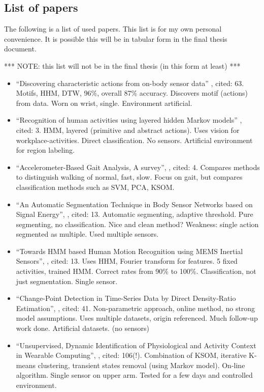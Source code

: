 
\subsection{List of papers}
The following is a list of used papers.
This list is for my own personal convenience.
It is possible this will be in tabular form in the final thesis document.

*** NOTE: this list will not be in the final thesis (in this form at least) ***

\begin{itemize}
  \item ``Discovering characteristic actions from on-body sensor data'' \cite{minnen2006discovering}, cited: 63. Motifs, HHM, DTW, 96\%, overall 87\% accuracy. Discovers motif (actions) from data. Worn on wrist, single. Environment artificial.
  \item ``Recognition of human activities using layered hidden Markov models'' \cite{perdikis2008recognition}, cited: 3. HMM, layered (primitive and abstract actions). Uses vision for workplace-activities. Direct classification. No sensors. Artificial environment for region labeling.
  \item ``Accelerometer-Based Gait Analysis, A survey'', \cite{derawi2010accelerometer}, cited: 4. Compares methods to distinguish walking of normal, fast, slow. Focus on gait, but compares classification methods such as SVM, PCA, KSOM.
  \item ``An Automatic Segmentation Technique in Body Sensor Networks based on Signal Energy'', \cite{guenterberg2009automatic}, cited: 13. Automatic segmenting, adaptive threshold. Pure segmenting, no classification. Nice and clean method? Weakness: single action segmented as multiple. Used multiple sensors.
  \item ``Towards HMM based Human Motion Recognition using MEMS Inertial Sensors'', \cite{shi2009towards}, cited: 13. Uses HHM, Fourier transform for features. 5 fixed activities, trained HMM. Correct rates from 90\% to 100\%. Classification, not just segmentation. Single sensor.
  \item ``Change-Point Detection in Time-Series Data by Direct Density-Ratio Estimation'', \cite{kawahara2009change}, cited: 41. Non-parametric approach, online method, no strong model assumptions. Uses multiple datasets, origin referenced. Much follow-up work done. Artificial datasets. (no sensors)
  \item ``Unsupervised, Dynamic Identification of Physiological and Activity Context in Wearable Computing'', \cite{krause2003unsupervised}, cited: 106(!). Combination of KSOM, iterative K-means clustering, transient states removal (using Markov model). On-line algorithm. Single sensor on upper arm. Tested for a few days and controlled environment.

\end{itemize}
